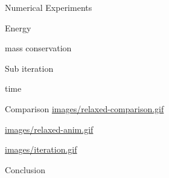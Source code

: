 \documentclass[presentation]{beamer}
\begin{document}
\begin{frame}[label={sec:org596cfe3}]{Numerical Experiments}
\begin{block}{Energy}
\begin{center}

\label{fig:energy-balance}
\end{center}

\begin{center}

\label{fig:relaxed-energy-balance}
\end{center}
\end{block}
\begin{block}{mass conservation}
\begin{center}

\label{fig:relaxed-mass-balance}
\end{center}
\end{block}
\begin{block}{Sub iteration}
\begin{center}

\label{fig:relaxed-convergence}
\end{center}
\end{block}
\begin{block}{time}
\begin{center}

\label{fig:relaxed-stability-in-time}
\end{center}
\end{block}
\end{frame}
\begin{frame}[label={sec:org9283679}]{Comparison}
\url{images/relaxed-comparison.gif}

\url{images/relaxed-anim.gif}

\url{images/iteration.gif}
\end{frame}
\begin{frame}[label={sec:org845d90f}]{Conclusion}
\end{frame}
\end{document}
